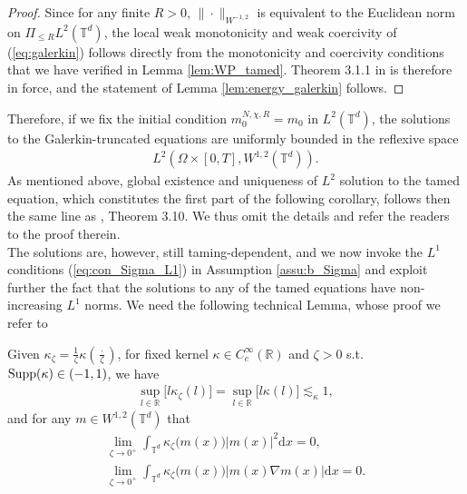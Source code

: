 \begin{proof}Since for any finite $R > 0$, $\|\cdot\|_{W^{-1,2}}$ is equivalent to the Euclidean norm on $\Pi_{\leq R}L^2(\mathbb{T}^d)$, the local weak monotonicity and weak coercivity of (\ref{eq:galerkin}) follows directly from the monotonicity and coercivity conditions that we have verified in Lemma \ref{lem:WP_tamed}. Theorem 3.1.1 in \cite{LR15} is therefore in force, and the statement of Lemma \ref{lem:energy_galerkin} follows.
\end{proof}

Therefore, if we fix the initial condition $m_0^{N,\chi,R} = m_0$ in $L^2(\mathbb{T}^d)$, the solutions to the Galerkin-truncated equations are uniformly bounded in the reflexive space 
\begin{align*}
    L^2(\Omega \times [0,T],W^{1,2}(\mathbb{T}^d)).
\end{align*}
As mentioned above, global existence and uniqueness of $L^2$ solution to the tamed equation, which constitutes the first part of the following corollary, follows then the same line as \cite{DKP23}, Theorem 3.10. We thus omit the details and refer the readers to the proof therein.\\

The solutions are, however, still taming-dependent, and we now invoke the $L^1$ conditions (\ref{eq:con_Sigma_L1}) in Assumption \ref{assu:b_Sigma} and exploit further the fact that the solutions to any of the tamed equations have non-increasing $L^1$ norms. We need the following technical Lemma, whose proof we refer to \cite[Lemma A.2]{djurdjevac2025weak}

\begin{lem}\label{lem:approx_id_kappa}Given $\kappa_{\zeta} = \frac{1}{\zeta}\kappa(\frac{\cdot}{\zeta})$, for fixed kernel $\kappa \in C_c^{\infty}(\mathbb{R})$ and $\zeta >0$ s.t. $\operatorname{Supp}(\kappa) \in (-1,1)$, we have
\begin{align}\label{eq:bound_lkappal}
\sup_{l \in \mathbb{R}} \big[l\kappa_{\zeta}(l)\big] = \sup_{l \in \mathbb{R}}\big[l\kappa(l) \big]\lesssim_{\kappa} 1,
 \end{align}
and for any $m \in W^{1,2}(\mathbb{T}^d)$ that
\begin{equation}
\begin{split}
 \lim_{\zeta \to 0^+} \int_{\mathbb{T}^d}\kappa_{\zeta}\big(m(x)\big)|m(x)|^2\mathrm{d}x = 0,\\
     \lim_{\zeta \to 0^+} \int_{\mathbb{T}^d}\kappa_{\zeta}\big(m(x)\big) |m(x) \nabla m(x)|\mathrm{d}x = 0.
     \end{split}
\end{equation}
\end{lem}

